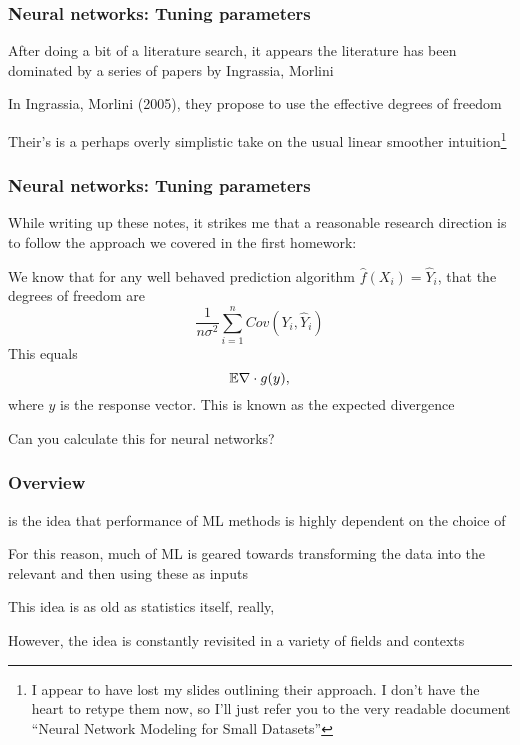 \documentclass[12pt]{beamer}
\begin{document}
\begin{frame}[fragile]
\frametitle{Neural networks: Tuning parameters}
After doing a bit of a literature search, it appears the literature has been dominated by a series
of papers by Ingrassia, Morlini

\vsp
In Ingrassia, Morlini (2005), they propose to use the effective degrees of freedom

\vsp
Their's is a perhaps overly simplistic take on the usual linear smoother intuition\footnote{I appear to have lost my 
slides outlining their approach.  I don't have the heart to retype them now, so I'll just refer you to the very readable
document ``Neural Network Modeling for Small Datasets''}
\end{frame}


\begin{frame}[fragile]
\frametitle{Neural networks: Tuning parameters}
While writing up these notes, it strikes me that a reasonable research direction is to follow the approach we covered
in the first homework: 

\vsp
We know that for any well behaved prediction algorithm $\hat{f}(X_i) = \hat Y_i$, that the degrees of freedom are
\[
\frac{1}{n\sigma^2} \sum_{i=1}^n Cov(Y_i,\hat{Y}_i)
\]
This equals
\[
\mathbb{E} \nabla \cdot g(y),
\]
where $y$ is the response vector.  This is known as the expected divergence

\vsp
{} Can you calculate this for neural networks?
\end{frame}


\begin{frame}[fragile]
\frametitle{Overview}
 is the idea that performance of ML methods is highly dependent on the choice
of 

\vsp
For this reason, much of ML is geared towards transforming the data into the relevant  and
then using these as inputs

\vsp
This idea is as old as statistics itself, really, 


\vsp
However, the idea is constantly revisited in a variety of fields and contexts
\end{frame}
\end{document}
